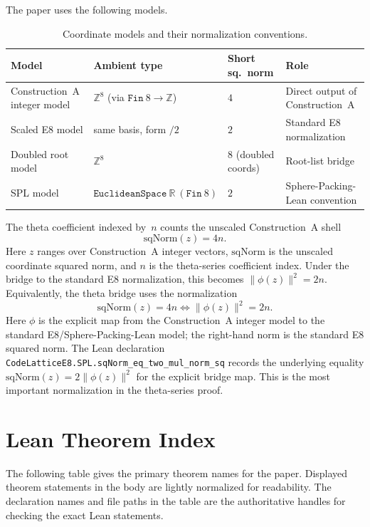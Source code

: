 \documentclass[12pt]{article}
\theoremstyle{definition}
\newcommand{\Z}{\mathbb{Z}}
\newcommand{\R}{\mathbb{R}}
\newcommand{\code}[1]{\texttt{#1}}
\newcommand{\lean}[1]{\texttt{#1}}
\begin{document}
The paper uses the following models.

\begin{table}[h]
\centering
\renewcommand{\arraystretch}{1.35}
\begin{tabular}{@{}llll@{}}
\toprule
\textbf{Model} & \textbf{Ambient type} & \textbf{Short sq.\ norm} & \textbf{Role} \\
\midrule
Construction~A integer model &
  $\Z^8$ (via $\code{Fin}\ 8 \to \Z$) &
  $4$ &
  Direct output of Construction~A \\
Scaled E8 model &
  same basis, form $/2$ &
  $2$ &
  Standard E8 normalization \\
Doubled root model &
  $\Z^8$ &
  $8$ (doubled coords) &
  Root-list bridge \\
SPL model &
  $\code{EuclideanSpace}\ \R\ (\code{Fin}\ 8)$ &
  $2$ &
  Sphere-Packing-Lean convention \\
\bottomrule
\end{tabular}
\caption{Coordinate models and their normalization conventions.}
\label{tab:models}
\end{table}

The theta coefficient indexed by~$n$ counts the unscaled Construction~A shell
\[
  \mathrm{sqNorm}(z) = 4n.
\]
Here \(z\) ranges over Construction~A integer vectors, \(\mathrm{sqNorm}\) is
the unscaled coordinate squared norm, and \(n\) is the theta-series coefficient
index.
Under the bridge to the standard E8 normalization, this becomes
$\|\phi(z)\|^2 = 2n$.
Equivalently, the theta bridge uses the normalization
\[
  \mathrm{sqNorm}(z) = 4n \iff \|\phi(z)\|^2 = 2n.
\]
Here \(\phi\) is the explicit map from the Construction~A integer model to the
standard E8/Sphere-Packing-Lean model; the right-hand norm is the standard E8
squared norm.
The Lean declaration \lean{CodeLatticeE8.SPL.sqNorm\_eq\_two\_mul\_norm\_sq}
records the underlying equality $\mathrm{sqNorm}(z) = 2\|\phi(z)\|^2$ for the
explicit bridge map.  This is the most important normalization in the
theta-series proof.

\section{Lean Theorem Index}
\label{app:theorems}

The following table gives the primary theorem names for the paper.
Displayed theorem statements in the body are lightly normalized for
readability.  The declaration names and file paths in the table are the
authoritative handles for checking the exact Lean statements.
\end{document}

